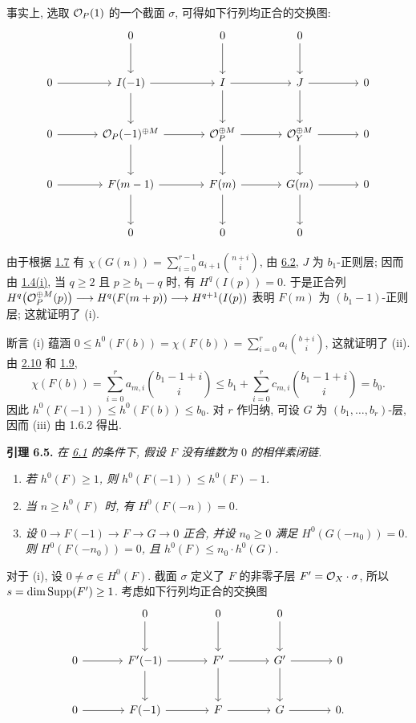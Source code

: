 事实上, 选取 $\mathcal O_P(1)$ 的一个截面 $\sigma$, 可得如下行列均正合的交换图:
\[
\begin{tikzcd}[column sep=large,row sep=large]
&0 \arrow[d]&0 \arrow[d]&0 \arrow[d]&\\
0 \arrow[r]&I(-1) \arrow[r] \arrow[d]&I \arrow[r] \arrow[d]&J \arrow[r] \arrow[d]&0\\
0 \arrow[r]&\cO_P(-1)^{\oplus M} \arrow[r] \arrow[d]&\cO_P^{\oplus M} \arrow[r] \arrow[d]&\cO_Y^{\oplus M} \arrow[r] \arrow[d]&0\\
0 \arrow[r]&F(m-1) \arrow[r] \arrow[d]&F(m) \arrow[r] \arrow[d]&G(m) \arrow[r] \arrow[d]&0\\
&0&0&0&
\end{tikzcd}
\]

由于根据 \hyperlink{sga6.e13.lem.1-7}{1.7} 有 $\chi(G(n))=\sum_{i=0}^{r-1}a_{i+1}\binom{n+i}{i}$,
由 \hyperlink{sga6.e13.lem.6-2}{6.2}, $J$ 为 $b_1$-正则层; 因而由 \hyperlink{sga6.e13.prop.1-4}{1.4(i)}, 当
$q\geq2$ 且 $p\geq b_1-q$ 时, 有 $H^q(I(p))=0$. 于是正合列
$H^q\bigl(\mathcal O_P^{\oplus M}(p)\bigr)\longrightarrow
H^q(F(m+p))\longrightarrow H^{q+1}(I(p))$ 表明 $F(m)$ 为
$(b_1-1)$-正则层; 这就证明了 (i).

断言 (i) 蕴涵
$0\leq h^0(F(b))=\chi(F(b))
=\sum_{i=0}^{r}a_i\binom{b+i}{i}$, 这就证明了 (ii). 由 \hyperlink{sga6.e13.rem.2-10}{2.10} 和 \hyperlink{sga6.e13.def.1-9}{1.9},
\[
  \chi(F(b))
  =\sum_{i=0}^{r}a_{m,i}\binom{b_1-1+i}{i}
  \leq b_1+\sum_{i=0}^{r}c_{m,i}\binom{b_1-1+i}{i}
  =b_0.
\]
因此 $h^0(F(-1))\leq h^0(F(b))\leq b_0$. 对 $r$ 作归纳, 可设 $G$ 为 $(b_1,\ldots,b_r)$-层, 因而 (iii) 由 1.6.2 得出.

\textbf{引理 6.5.} \emph{在 \hyperlink{sga6.e13.para.6-1}{6.1} 的条件下, 假设 $F$
没有维数为 $0$ 的相伴素闭链.}
\begin{enumerate}[label=(\roman*)]
\item \emph{若 $h^0(F)\geq1$, 则 $h^0(F(-1))\leq h^0(F)-1$.}
\item \emph{当 $n\geq h^0(F)$ 时, 有 $H^0(F(-n))=0$.}
\item \emph{设 $0\to F(-1)\to F\to G\to0$ 正合, 并设
$n_0\geq0$ 满足 $H^0(G(-n_0))=0$. 则 $H^0(F(-n_0))=0$, 且
$h^0(F)\leq n_0\cdot h^0(G)$.}
\end{enumerate}

对于 (i), 设 $0\ne\sigma\in H^0(F)$. 截面 $\sigma$ 定义了 $F$ 的非零子层 $F'=\mathcal O_X\cdot\sigma$, 所以 $s=\dim\operatorname{Supp}(F')\geq1$. 考虑如下行列均正合的交换图
\[
\begin{tikzcd}[column sep=large,row sep=large]
&0 \arrow[d]&0 \arrow[d]&0 \arrow[d]&\\
0 \arrow[r]&F'(-1) \arrow[r] \arrow[d]&F' \arrow[r] \arrow[d]&G' \arrow[r] \arrow[d]&0\\
0 \arrow[r]&F(-1) \arrow[r]&F \arrow[r]&G \arrow[r]&0.
\end{tikzcd}
\]

